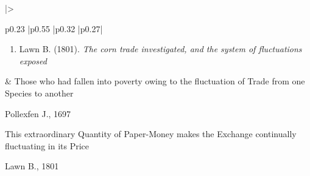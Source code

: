 \begin{longtable}{
    |>{\raggedright\arraybackslash}p{0.23\textwidth}
    |p{0.55\textwidth}
    |p{0.32\textwidth}
    |p{0.27\textwidth}|
    }
\begin{minipage}[t]{\linewidth}
\begin{enumerate}
        \item Lawn B. (1801). \textit{The corn trade investigated, and the system of fluctuations exposed}\cite{Lawn-1801}
    \end{enumerate}
\end{minipage}
&
\textquotedbl{}Those who had fallen into poverty owing to the fluctuation of Trade from one Species to another\textquotedbl{}
\begin{flushright}
    Pollexfen J., 1697\cite{Pollexfen-1697}
\end{flushright}
\vspace{7pt}
\textquotedbl{}This extraordinary Quantity of Paper-Money makes the Exchange continually fluctuating in its Price\textquotedbl{}
\begin{flushright}
    Lawn B., 1801\cite{Lawn-1801}
\end{flushright}
\\ \hline


\end{longtable}
